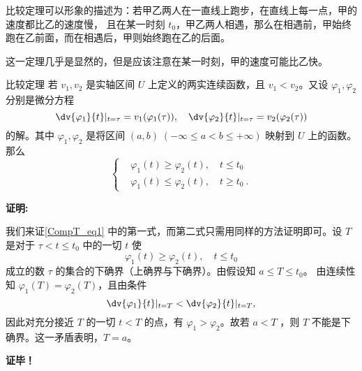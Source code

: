 比较定理可以形象的描述为：若甲乙两人在一直线上跑步，在直线上每一点，甲的速度都比乙的速度慢， 且在某一时刻 $t_0$，甲乙两人相遇，那么在相遇前，甲始终跑在乙前面，而在相遇后，甲则始终跑在乙的后面。

这一定理几乎是显然的，但是应该注意在某一时刻，甲的速度可能比乙快。
\begin{theorem}{比较定理}
若 $v_1,v_2$ 是实轴区间 $U$ 上定义的两实连续函数，且 $v_1<v_2$。又设 $\varphi_1,\varphi_2$ 分别是微分方程
\begin{equation}
\dv{\varphi_1}{t}|_{t=\tau}=v_1(\varphi_1(\tau)), \quad \dv{\varphi_2}{t}|_{t=\tau}=v_2(\varphi_2(\tau))
\end{equation}
的解。其中 $\varphi_1,\varphi_2$ 是将区间 $(a,b)\;(-\infty\leq a<b\leq+\infty)$ 映射到 $U$ 上的函数。那么
\begin{equation}\label{CompT_eq1}
\left\{\begin{aligned}
    &\varphi_1(t)\geq\varphi_2(t),\quad t\leq t_0\\
    &\varphi_1(t)\leq\varphi_2(t),\quad t\geq t_0~.
\end{aligned}\right.
\end{equation}

\end{theorem} 
\textbf{证明:}

我们来证\autoref{CompT_eq1} 中的第一式，而第二式只需用同样的方法证明即可。设 $T$ 是对于 $\tau<t\leq t_0$ 中的一切 $t$ 使
\begin{equation}
\varphi_1(t)\geq\varphi_2(t),\quad t\leq t_0
\end{equation}
成立的数 $\tau$ 的集合的下确界（上确界与下确界）。由假设知 $a\leq T\leq t_0$。
由连续性知 $\varphi_1(T)=\varphi_2(T)$，且由条件
\begin{equation}
\dv{\varphi_1}{t}|_{t=T}<\dv{\varphi_2}{t}|_{t=T},
\end{equation}
因此对充分接近 $T$ 的一切 $t<T$ 的点，有 $\varphi_1>\varphi_2$。故若 $a<T$ ，则 $T$ 不能是下确界。这一矛盾表明，$T=a$。

\textbf{证毕！}
